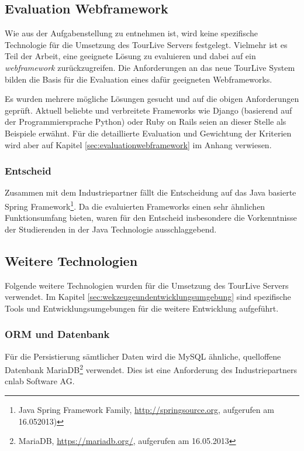 \subsection{Evaluation Webframework}
\label{sec:tourliveserverevaluationwebframework}
Wie aus der Aufgabenstellung zu entnehmen ist, wird keine spezifische Technologie für die Umsetzung des TourLive Servers festgelegt. Vielmehr ist es Teil der Arbeit, eine geeignete Lösung zu evaluieren und dabei auf ein \textit{\gls{webframework}} zurückzugreifen.
Die Anforderungen an das neue TourLive System bilden die Basis für die Evaluation eines dafür geeigneten Webframeworks.

Es wurden mehrere mögliche Lösungen gesucht und auf die obigen Anforderungen geprüft. Aktuell beliebte und verbreitete Frameworks wie Django (basierend auf der Programmiersprache Python) oder Ruby on Rails seien an dieser Stelle als Beispiele erwähnt. Für die detaillierte Evaluation und Gewichtung der Kriterien wird aber auf Kapitel \ref{sec:evaluationwebframework} im Anhang verwiesen.

\subsubsection{Entscheid}
Zusammen mit dem Industriepartner fällt die Entscheidung auf das Java basierte Spring Framework\footnote{Java Spring Framework Family, \url{http://springsource.org}, aufgerufen am 16.052013)}. Da die evaluierten Frameworks einen sehr ähnlichen Funktionsumfang bieten, waren für den Entscheid insbesondere die Vorkenntnisse der Studierenden in der Java Technologie ausschlaggebend.

\subsection{Weitere Technologien}
\label{sec:tourlivetechnologien}
Folgende weitere Technologien wurden für die Umsetzung des TourLive Servers verwendet. Im Kapitel \ref{sec:wekzeugeundentwicklungsumgebung} sind spezifische Tools und Entwicklungsumgebungen für die weitere Entwicklung aufgeführt.

\subsubsection{ORM und Datenbank}
Für die Persistierung sämtlicher Daten wird die MySQL ähnliche, quelloffene Datenbank MariaDB\footnote{MariaDB, \url{https://mariadb.org/}, aufgerufen am 16.05.2013} verwendet. Dies ist eine Anforderung des Industriepartners cnlab Software AG.

